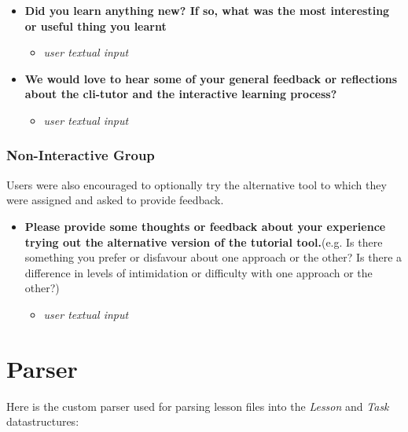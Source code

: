 \begin{itemize}
	\item  \textbf{Did you learn anything new? If so, what was the most interesting or useful thing you learnt}
	      \begin{itemize}
		      \item \textit{user textual input}
	      \end{itemize}

	\item  \textbf{We would love to hear some of your general feedback or reflections about the cli-tutor and the interactive learning process?}
	      \begin{itemize}
		      \item \textit{user textual input}
	      \end{itemize}
\end{itemize}

\subsubsection{Non-Interactive Group}
Users were also encouraged to optionally try the alternative tool to which they were assigned and asked to provide feedback.
\begin{itemize}
	\item  \textbf{Please provide some thoughts or feedback about your experience trying out the alternative version of the tutorial tool.}(e.g. Is there something you prefer or disfavour about one approach or the other? Is there a difference in levels of intimidation or difficulty with one approach or the other?)
	      \begin{itemize}
		      \item \textit{user textual input}
	      \end{itemize}
\end{itemize}

\section{Parser}

Here is the custom parser used for parsing lesson files into the
\textit{Lesson} and \textit{Task} datastructures:

